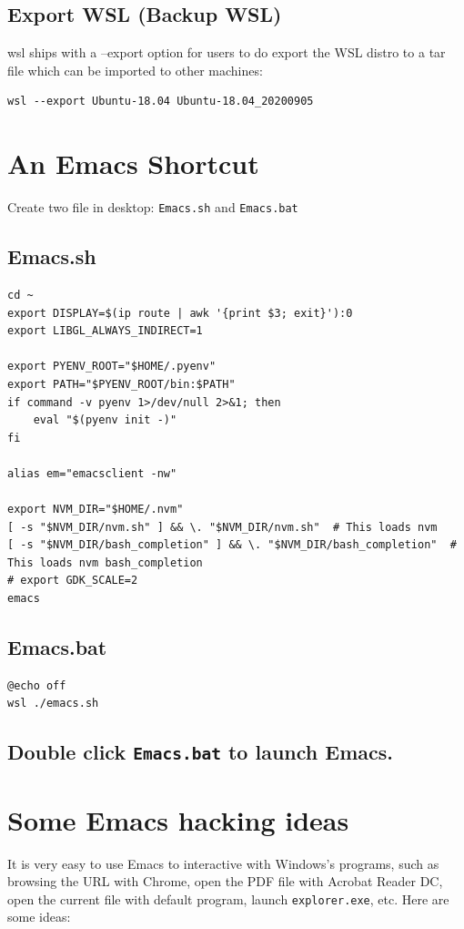 \documentclass[10pt]{article}
\begin{document}
\subsection{Export WSL (Backup WSL)}
\label{sec:org97ad1de}
wsl ships with a --export option for users to do export the WSL distro to a tar file which can be imported to other machines:
\begin{verbatim}
wsl --export Ubuntu-18.04 Ubuntu-18.04_20200905
\end{verbatim}

\section{An Emacs Shortcut}
\label{sec:orgb6c514c}
Create two file in desktop: \texttt{Emacs.sh} and \texttt{Emacs.bat}
\subsection{Emacs.sh}
\label{sec:org0c60ea3}
\begin{verbatim}
cd ~
export DISPLAY=$(ip route | awk '{print $3; exit}'):0
export LIBGL_ALWAYS_INDIRECT=1

export PYENV_ROOT="$HOME/.pyenv"
export PATH="$PYENV_ROOT/bin:$PATH"
if command -v pyenv 1>/dev/null 2>&1; then
    eval "$(pyenv init -)"
fi

alias em="emacsclient -nw"

export NVM_DIR="$HOME/.nvm"
[ -s "$NVM_DIR/nvm.sh" ] && \. "$NVM_DIR/nvm.sh"  # This loads nvm
[ -s "$NVM_DIR/bash_completion" ] && \. "$NVM_DIR/bash_completion"  # This loads nvm bash_completion
# export GDK_SCALE=2
emacs
\end{verbatim}

\subsection{Emacs.bat}
\label{sec:orgc6e546b}
\begin{verbatim}
@echo off
wsl ./emacs.sh
\end{verbatim}

\subsection{Double click \texttt{Emacs.bat} to launch Emacs.}
\label{sec:org8337015}

\section{Some Emacs hacking ideas}
\label{sec:org5a0daa0}
It is very easy to use Emacs to interactive with Windows's programs, such as browsing the URL with Chrome, open the PDF file with Acrobat Reader DC, open the current file with default program, launch \texttt{explorer.exe}, etc. Here are some ideas:
\end{document}
